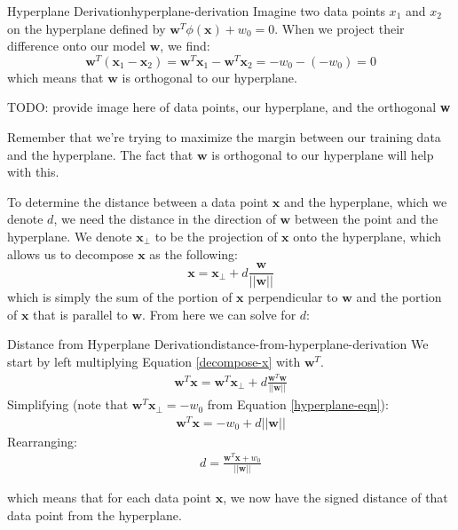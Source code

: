 \begin{derivation}{Hyperplane Derivation}{hyperplane-derivation}
	Imagine two data points $x_{1}$ and $x_{2}$ on the hyperplane defined by $\textbf{w}^{T}\phi(\textbf{x}) + w_{0} = 0$. When we project their difference onto our model $\textbf{w}$, we find:
	\begin{equation} \label{hyperplane-eqn}
		\textbf{w}^{T}(\textbf{x}_{1} - \textbf{x}_{2}) = \textbf{w}^{T}\textbf{x}_{1} - \textbf{w}^{T}\textbf{x}_{2} = -w_{0} - (-w_{0}) = 0
	\end{equation}
	which means that $\textbf{w}$ is orthogonal to our hyperplane.
\end{derivation}
TODO: provide image here of data points, our hyperplane, and the orthogonal \textbf{w}

Remember that we're trying to maximize the margin between our training data and the hyperplane. The fact that $\textbf{w}$ is orthogonal to our hyperplane will help with this.

To determine the distance between a data point $\textbf{x}$ and the hyperplane, which we denote $d$, we need the distance in the direction of $\textbf{w}$ between the point and the hyperplane. We denote $\textbf{x}_{\perp}$ to be the projection of $\textbf{x}$ onto the hyperplane, which allows us to decompose $\textbf{x}$ as the following:
\begin{equation} \label{decompose-x}
	\textbf{x} = \textbf{x}_{\perp} + d \frac{\textbf{w}}{|| \textbf{w} ||}
\end{equation}
which is simply the sum of the portion of $\textbf{x}$ perpendicular to $\textbf{w}$ and the portion of $\textbf{x}$ that is parallel to $\textbf{w}$. From here we can solve for $d$:
\begin{derivation}{Distance from Hyperplane Derivation}{distance-from-hyperplane-derivation}
	We start by left multiplying Equation \ref{decompose-x} with $\textbf{w}^{T}$.
	\begin{align*}
		\textbf{w}^{T}\textbf{x} = \textbf{w}^{T}\textbf{x}_{\perp} + d \frac{\textbf{w}^{T}\textbf{w}}{||\textbf{w}||}
	\end{align*}
	Simplifying (note that $\textbf{w}^{T}\textbf{x}_{\perp} = -w_{0}$ from Equation \ref{hyperplane-eqn}):
	\begin{align*}
		\textbf{w}^{T}\textbf{x} =  - w_{0} + d ||\textbf{w}||
	\end{align*}
	Rearranging:
	\begin{align*}
		d = \frac{\textbf{w}^{T}\textbf{x} + w_{0}}{||\textbf{w}||}
	\end{align*}
\end{derivation}
which means that for each data point $\textbf{x}$, we now have the signed distance of that data point from the hyperplane.

